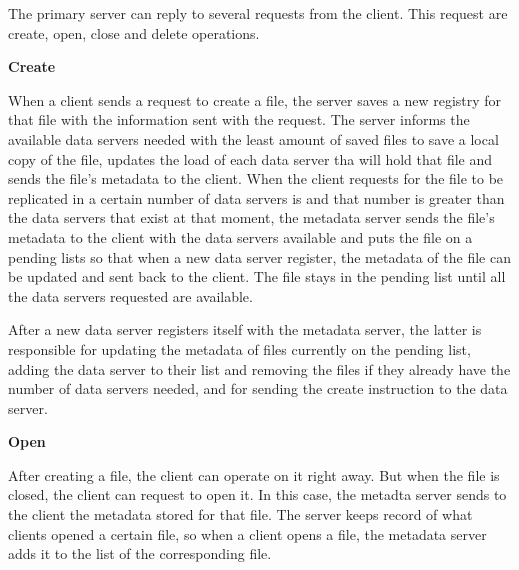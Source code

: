 The primary server can reply to several requests from the client. This
request are create, open, close and delete operations.

\medskip
\textbf{Create}
\smallskip 

When a client sends a request to create a file, the server saves a new
registry for that file with the information sent with the request. The
server informs the available data servers needed with the least amount
of saved files to save a local copy of the file, updates the load
of each data server tha will hold that file and sends the file's metadata
to the client. When the client requests for the file to be replicated in
a certain number of data servers is  and that number is greater than the 
data servers that exist at that moment, the metadata server sends the 
file's metadata to the client with the data servers available and puts the 
file on a pending lists so that when a new data server register, the metadata 
of the file can be updated and sent back to the client. The file stays in the 
pending list until all the data servers requested are available.

After a new data server registers itself with the metadata server, the latter
is responsible for updating the metadata of files currently on the pending
list, adding the data server to their list and removing the files if they already
have the number of data servers needed, and for sending the create instruction
to the data server.


\bigskip
\textbf{Open}
\smallskip

After creating a file, the client can operate on it right away. But when
the file is closed, the client can request to open it. In this case, the
metadta server sends to the client the metadata stored for that file. The
server keeps record of what clients opened a certain file, so when a client
opens a file, the metadata server adds it to the list of the corresponding
file.

